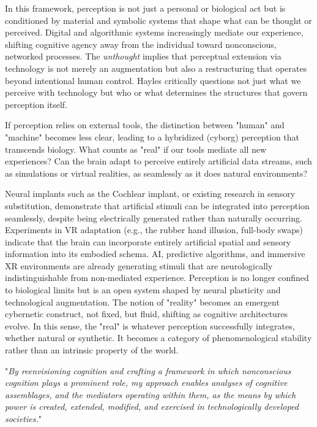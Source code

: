 In this framework, perception is not just a personal or biological act but is conditioned by material and symbolic systems that shape what can be thought or perceived. Digital and algorithmic systems increasingly mediate our experience, shifting cognitive agency away from the individual toward nonconscious, networked processes. The \textit{unthought} implies that perceptual extension via technology is not merely an augmentation but also a restructuring that operates beyond intentional human control. Hayles critically questions not just what we perceive with technology but who or what determines the structures that govern perception itself.

If perception relies on external tools, the distinction between "human" and "machine" becomes less clear, leading to a hybridized (cyborg) perception that transcends biology. What counts as "real" if our tools mediate all new experiences? Can the brain adapt to perceive entirely artificial data streams, such as simulations or virtual realities, as seamlessly as it does natural environments?  

Neural implants such as the Cochlear implant, or existing research in sensory substitution, demonstrate that artificial stimuli can be integrated into perception seamlessly, despite being electrically generated rather than naturally occurring. Experiments in VR adaptation (e.g., the rubber hand illusion, full-body swaps) indicate that the brain can incorporate entirely artificial spatial and sensory information into its embodied schema. AI, predictive algorithms, and immersive XR environments are already generating stimuli that are neurologically indistinguishable from non-mediated experience. Perception is no longer confined to biological limits but is an open system shaped by neural plasticity and technological augmentation. The notion of "reality" becomes an emergent cybernetic construct, not fixed, but fluid, shifting as cognitive architectures evolve. In this sense, the "real" is whatever perception successfully integrates, whether natural or synthetic. It becomes a category of phenomenological stability rather than an intrinsic property of the world. 

"\textit{By reenvisioning cognition and crafting a framework in which nonconscious cognition plays a prominent role, my approach enables analyses of cognitive assemblages, and the mediators operating within them, as the means by which power is created, extended, modified, and exercised in technologically developed societies.}"\citep{hayles2017}

